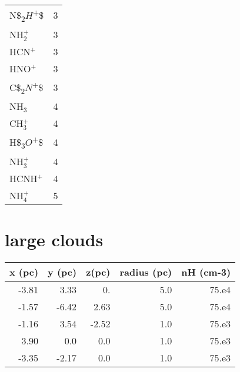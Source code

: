\documentclass[11pt]{article}
\begin{document}
\begin{center}
\begin{tabular}{lr}
N\$\textsubscript{2}\(H\)\textsuperscript{+}\$ & 3\\
NH\(_2^{+}\) & 3\\
HCN\(^{+}\) & 3\\
HNO\(^{+}\) & 3\\
C\$\textsubscript{2}\(N\)\textsuperscript{+}\$ & 3\\
NH\(_3\) & 4\\
CH\(_3^{+}\) & 4\\
H\$\textsubscript{3}\(O\)\textsuperscript{+}\$ & 4\\
NH\(_3^{+}\) & 4\\
HCNH\(^{+}\) & 4\\
NH\(_4^{+}\) & 5\\
\end{tabular}
\end{center}

\section{large clouds}
\label{sec:org1fe0316}
\begin{center}
\begin{tabular}{rrrrr}
x (pc) & y (pc) & z(pc) & radius (pc) & nH (cm-3)\\
\hline
-3.81 & 3.33 & 0. & 5.0 & 75.e4\\
-1.57 & -6.42 & 2.63 & 5.0 & 75.e4\\
-1.16 & 3.54 & -2.52 & 1.0 & 75.e3\\
3.90 & 0.0 & 0.0 & 1.0 & 75.e3\\
-3.35 & -2.17 & 0.0 & 1.0 & 75.e3\\
\end{tabular}
\end{center}
\end{document}

